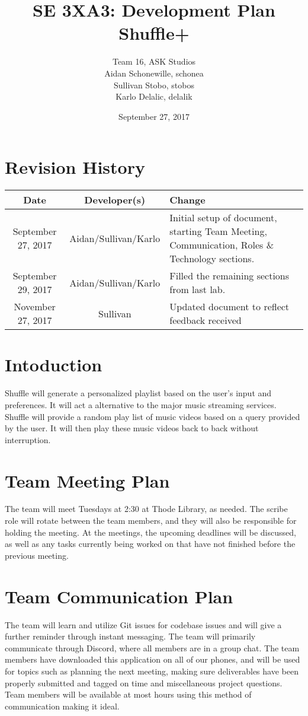 \documentclass{article}
\title{SE 3XA3: Development Plan\\Shuffle+}
\author{Team 16, ASK Studios
        \\ Aidan Schonewille, schonea
        \\ Sullivan Stobo, stobos
        \\ Karlo Delalic, delalik
}
\date{September 27, 2017}
\begin{document}
\section*{Revision History}
\begin{center}
\begin{tabular}{| c | c | p{6cm} |}
\hline
\textbf{Date} & \textbf{Developer(s)} & \textbf{Change}\\
\hline
September 27, 2017 & Aidan/Sullivan/Karlo & Initial setup of document, starting Team Meeting, Communication, Roles \& Technology sections.\\
\hline
September 29, 2017 & Aidan/Sullivan/Karlo & Filled the remaining sections from last lab.\\
\hline
November 27, 2017 & Sullivan & Updated document to reflect feedback received \\
\hline
\end{tabular}
\end{center}

\newpage

\maketitle

\newpage

\section*{Intoduction}
Shuffle will generate a personalized playlist based on the user's input and preferences. It will act a alternative to the major music streaming services. Shuffle will provide a random play list of music videos based on a query provided by the user.  It will then play these music videos back to back without interruption.

\section{Team Meeting Plan}
The team will meet Tuesdays at 2:30 at Thode Library, as needed. The scribe role will rotate between the team members, and they will also be responsible for holding the meeting. At the meetings, the upcoming deadlines will be discussed, as well as any tasks currently being worked on that have not finished before the previous meeting.

\section{Team Communication Plan}
The team will learn and utilize Git issues for codebase issues and will give a further reminder through instant messaging. The team will primarily communicate through Discord, where all members are in a group chat. The team members have downloaded this application on all of our phones, and will be used for topics such as planning the next meeting, making sure deliverables have been properly submitted and tagged on time and miscellaneous project questions.  Team members will be available at most hours using this method of communication making it ideal.
\end{document}
